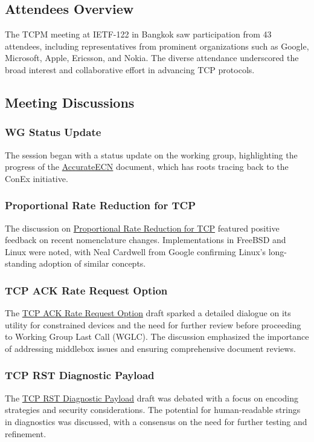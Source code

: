 \documentclass{article}
\begin{document}
\subsection{Attendees Overview}
The TCPM meeting at IETF-122 in Bangkok saw participation from 43 attendees, including representatives from prominent organizations such as Google, Microsoft, Apple, Ericsson, and Nokia. The diverse attendance underscored the broad interest and collaborative effort in advancing TCP protocols.

\subsection{Meeting Discussions}

\subsubsection{WG Status Update}
The session began with a status update on the working group, highlighting the progress of the \href{https://datatracker.ietf.org/doc/html/draft-ietf-tcpm-accurateecn}{AccurateECN} document, which has roots tracing back to the ConEx initiative.

\subsubsection{Proportional Rate Reduction for TCP}
The discussion on \href{https://datatracker.ietf.org/doc/html/draft-ietf-tcpm-prr-rfc6937bis-13}{Proportional Rate Reduction for TCP} featured positive feedback on recent nomenclature changes. Implementations in FreeBSD and Linux were noted, with Neal Cardwell from Google confirming Linux's long-standing adoption of similar concepts.

\subsubsection{TCP ACK Rate Request Option}
The \href{https://datatracker.ietf.org/doc/html/draft-ietf-tcpm-ack-rate-request-07}{TCP ACK Rate Request Option} draft sparked a detailed dialogue on its utility for constrained devices and the need for further review before proceeding to Working Group Last Call (WGLC). The discussion emphasized the importance of addressing middlebox issues and ensuring comprehensive document reviews.

\subsubsection{TCP RST Diagnostic Payload}
The \href{https://datatracker.ietf.org/doc/html/draft-boucadair-tcpm-rst-diagnostic-payload-11}{TCP RST Diagnostic Payload} draft was debated with a focus on encoding strategies and security considerations. The potential for human-readable strings in diagnostics was discussed, with a consensus on the need for further testing and refinement.
\end{document}
